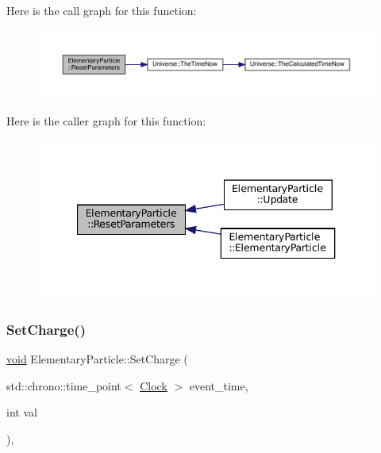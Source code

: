 Here is the call graph for this function\+:\nopagebreak
\begin{figure}[H]
\begin{center}
\leavevmode
\includegraphics[width=350pt]{class_elementary_particle_ac0f85f34bdfc1d42324201eb7c38e85e_cgraph}
\end{center}
\end{figure}
Here is the caller graph for this function\+:\nopagebreak
\begin{figure}[H]
\begin{center}
\leavevmode
\includegraphics[width=340pt]{class_elementary_particle_ac0f85f34bdfc1d42324201eb7c38e85e_icgraph}
\end{center}
\end{figure}
\mbox{\label{class_elementary_particle_abbc6d3c58509c4121df55bfef716d2f1}} 
\subsubsection{\texorpdfstring{Set\+Charge()}{SetCharge()}}
{\footnotesize\ttfamily \mbox{\hyperlink{glad_8h_a950fc91edb4504f62f1c577bf4727c29}{void}} Elementary\+Particle\+::\+Set\+Charge (\begin{DoxyParamCaption}\item[{std\+::chrono\+::time\+\_\+point$<$ \mbox{\hyperlink{universe_8h_a0ef8d951d1ca5ab3cfaf7ab4c7a6fd80}{Clock}} $>$}]{event\+\_\+time,  }\item[{int}]{val }\end{DoxyParamCaption})\hspace{0.3cm}{\ttfamily [inline]}, {\ttfamily [virtual]}}



